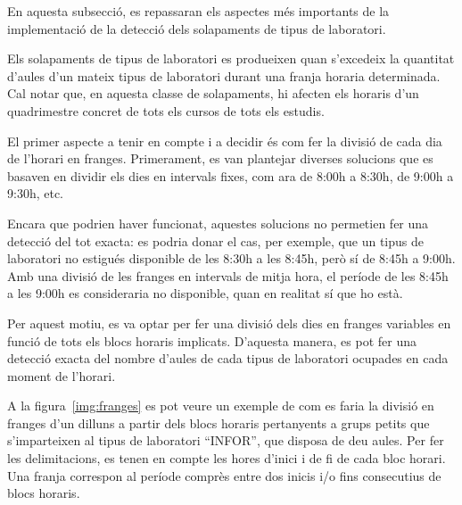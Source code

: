 \documentclass[a4paper,12pt]{ThesisStyle}
\begin{document}
En aquesta subsecció, es repassaran els aspectes més importants de la implementació de la detecció dels solapaments de tipus de laboratori.

Els solapaments de tipus de laboratori es produeixen quan s'excedeix la quantitat d'aules d'un mateix tipus de laboratori durant una franja horaria determinada. Cal notar que, en aquesta classe de solapaments, hi afecten els horaris d'un quadrimestre concret de tots els cursos de tots els estudis.

El primer aspecte a tenir en compte i a decidir és com fer la divisió de cada dia de l'horari en franges. Primerament, es van plantejar diverses solucions que es basaven en dividir els dies en intervals fixes, com ara de 8:00h a 8:30h, de 9:00h a 9:30h, etc.

Encara que podrien haver funcionat, aquestes solucions no permetien fer una detecció del tot exacta: es podria donar el cas, per exemple, que un tipus de laboratori no estigués disponible de les 8:30h a les 8:45h, però sí de 8:45h a 9:00h. Amb una divisió de les franges en intervals de mitja hora, el període de les 8:45h a les 9:00h es consideraria no disponible, quan en realitat sí que ho està.

Per aquest motiu, es va optar per fer una divisió dels dies en franges variables en funció de tots els blocs horaris implicats. D'aquesta manera, es pot fer una detecció exacta del nombre d'aules de cada tipus de laboratori ocupades en cada moment de l'horari.

A la figura~\ref{img:franges} es pot veure un exemple de com es faria la divisió en franges d'un dilluns a partir dels blocs horaris pertanyents a grups petits que s'imparteixen al tipus de laboratori ``INFOR'', que disposa de deu aules. Per fer les delimitacions, es tenen en compte les hores d'inici i de fi de cada bloc horari. Una franja correspon al període comprès entre dos inicis i/o fins consecutius de blocs horaris.
\end{document}
